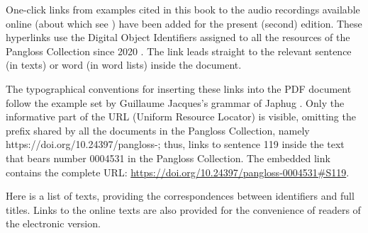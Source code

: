 One-click links from examples cited in this book to the audio recordings available online (about which see ) have been added for the present (second) edition. These hyperlinks use the Digital Object Identifiers assigned to all the resources of the Pangloss Collection since 2020 \citep{vasile2020doi}. The link leads straight to the relevant sentence (in texts) or word (in word lists) inside the document. 

The typographical conventions for inserting these links into the PDF document follow the example set by Guillaume Jacques's grammar of Japhug \citep[3]{jacques2021}. Only the informative part of the URL (Uniform Resource Locator) is visible, omitting the prefix shared by all the documents in the Pangloss Collection, namely \mbox{https://doi.org/10.24397/pangloss-}; thus,  links to sentence 119 inside the text that bears number 0004531 in the Pangloss Collection. The embedded link contains the complete URL: \url{https://doi.org/10.24397/pangloss-0004531\#S119}. 

Here is a list of texts, providing the correspondences between
identifiers and full titles. Links to the online texts are also provided for the convenience of readers of the electronic version.


  
